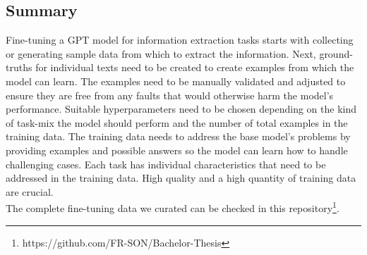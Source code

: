 \subsection*{Summary}
Fine-tuning a GPT model for information extraction tasks starts with collecting or generating sample data from which to extract the information. Next, ground-truths for individual texts need to be created to create examples from which the model can learn. The examples need to be manually validated and adjusted to ensure they are free from any faults that would otherwise harm the model's performance. Suitable hyperparameters need to be chosen depending on the kind of task-mix the model should perform and the number of total examples in the training data. The training data needs to address the base model's problems by providing examples and possible answers so the model can learn how to handle challenging cases. Each task has individual characteristics that need to be addressed in the training data. High quality and a high quantity of training data are crucial.\\
The complete fine-tuning data we curated can be checked in this repository\footnote{https://github.com/FR-SON/Bachelor-Thesis}.